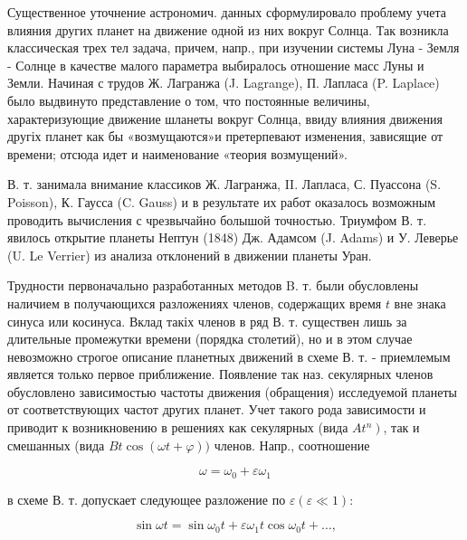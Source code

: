 \documentclass[10pt]{article}
\begin{document}
Существенное уточнение астрономич. данных сформулировало проблему учета влияния других планет на движение одной из них вокруг Солнца. Так возникла классическая трех тел задача, причем, напр., при изучении системы Луна - Земля - Солнце в качестве малого параметра выбиралось отношение масс Луны и Земли. Начиная с трудов Ж. Лагранжа (J. Lagrange), П. Лапласа (P. Laplace) было выдвинуто представление о том, что постоянные величины, характеризующие движение шланеты вокруг Солнца, ввиду влияния движения другіх планет как бы «возмущаются»и претерпевают изменения, зависящие от времени; отсюда идет и наименование «теория возмущений».



В. т. занимала внимание классиков Ж. Лагранжа, II. Лапласа, С. Пуассона (S. Poisson), К. Гаусса (C. Gauss) и в результате их работ оказалось возможным проводить вычисления с чрезвычайно болышой точностью. Триумфом В. т. явилось открытие планеты Нептун (1848) Дж. Адамсом (J. Adams) и У. Леверье (U. Le Verrier) из анализа отклонений в движении планеты Уран.



Трудности первоначально разработанных методов B. т. были обусловлены наличием в получающихся разложениях членов, содержащих время $t$ вне знака синуса или косинуса. Вклад такіх членов в ряд В. т. существен лишь за длительные промежутки времени (порядка столетий), но и в этом случае невозможно строгое описание планетных движений в схеме В. т. - приемлемым является только первое приближение. Появление так наз. секулярных членов обусловлено зависимостью частоты движения (обращения) исследуемой планеты от соответствующих частот других планет. Учет такого рода зависимости и приводит к возникновению в решениях как секулярных (вида $\left.A t^{n}\right)$, так и смешанных (вида $B t \cos (\omega t+\varphi))$ членов. Напр., соотношение



\[

\omega=\omega_{0}+\varepsilon \omega_{1}

\]



в схеме В. т. допускает следующее разложение по $\varepsilon(\varepsilon \ll 1):$



\[

\sin \omega t=\sin \omega_{0} t+\varepsilon \omega_{1} t \cos \omega_{0} t+\ldots,

\]
\end{document}
